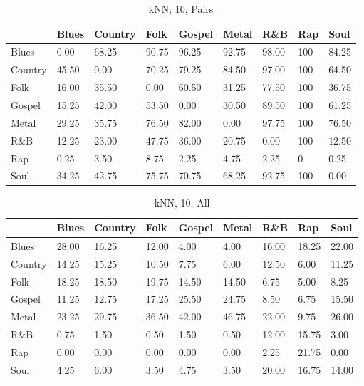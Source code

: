 \documentclass[a4paper,oneside]{article}
\begin{document}
\begin{table}[H]\centering
\caption{kNN, 10, Pairs}
\begin{tabu}{l|*{8}{l}}
 & Blues & Country & Folk & Gospel & Metal & R\&B & Rap & Soul \\ \hline
Blues & 0.00 & 68.25 & 90.75 & 96.25 & 92.75 & 98.00 & 100 & 84.25 \\
Country & 45.50 & 0.00 & 70.25 & 79.25 & 84.50 & 97.00 & 100 & 64.50 \\
Folk & 16.00 & 35.50 & 0.00 & 60.50 & 31.25 & 77.50 & 100 & 36.75 \\
Gospel & 15.25 & 42.00 & 53.50 & 0.00 & 30.50 & 89.50 & 100 & 61.25 \\
Metal & 29.25 & 35.75 & 76.50 & 82.00 & 0.00 & 97.75 & 100 & 76.50 \\
R\&B & 12.25 & 23.00 & 47.75 & 36.00 & 20.75 & 0.00 & 100 & 12.50 \\
Rap & 0.25 & 3.50 & 8.75 & 2.25 & 4.75 & 2.25 & 0 & 0.25 \\
Soul & 34.25 & 42.75 & 75.75 & 70.75 & 68.25 & 92.75 & 100 & 0.00 \\
\end{tabu}
\end{table}

\begin{table}[H]\centering
\caption{kNN, 10, All}
\begin{tabu}{l|*{8}{l}}
 & Blues & Country & Folk & Gospel & Metal & R\&B & Rap & Soul \\ \hline
Blues & 28.00 & 16.25 & 12.00 & 4.00 & 4.00 & 16.00 & 18.25 & 22.00 \\
Country & 14.25 & 15.25 & 10.50 & 7.75 & 6.00 & 12.50 & 6.00 & 11.25 \\
Folk & 18.25 & 18.50 & 19.75 & 14.50 & 14.50 & 6.75 & 5.00 & 8.25 \\
Gospel & 11.25 & 12.75 & 17.25 & 25.50 & 24.75 & 8.50 & 6.75 & 15.50 \\
Metal & 23.25 & 29.75 & 36.50 & 42.00 & 46.75 & 22.00 & 9.75 & 26.00 \\
R\&B & 0.75 & 1.50 & 0.50 & 1.50 & 0.50 & 12.00 & 15.75 & 3.00 \\
Rap & 0.00 & 0.00 & 0.00 & 0.00 & 0.00 & 2.25 & 21.75 & 0.00 \\
Soul & 4.25 & 6.00 & 3.50 & 4.75 & 3.50 & 20.00 & 16.75 & 14.00 \\
\end{tabu}
\end{table}
\end{document}
